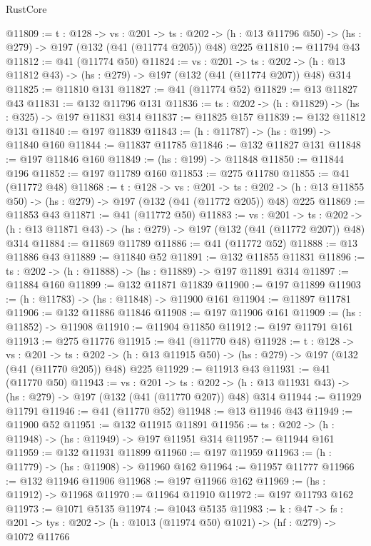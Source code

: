\begin{lexlean}{RustCore}
\begin{coremodule}
@11809 := {t : @128} ->
  {vs : @201} ->
  {ts : @202} -> (h : @13 @11796 @50) -> (hs : @279) -> @197 (@132 (@41 (@11774 @205)) @48) @225
@11810 := @11794 @43
@11812 := @41 (@11774 @50)
@11824 := {vs : @201} ->
  {ts : @202} -> (h : @13 @11812 @43) -> (hs : @279) -> @197 (@132 (@41 (@11774 @207)) @48) @314
@11825 := @11810 @131
@11827 := @41 (@11774 @52)
@11829 := @13 @11827 @43
@11831 := @132 @11796 @131
@11836 := {ts : @202} -> (h : @11829) -> (hs : @325) -> @197 @11831 @314
@11837 := @11825 @157
@11839 := @132 @11812 @131
@11840 := @197 @11839
@11843 := (h : @11787) -> (hs : @199) -> @11840 @160
@11844 := @11837 @11785
@11846 := @132 @11827 @131
@11848 := @197 @11846 @160
@11849 := (hs : @199) -> @11848
@11850 := @11844 @196
@11852 := @197 @11789 @160
@11853 := @275 @11780
@11855 := @41 (@11772 @48)
@11868 := {t : @128} ->
  {vs : @201} ->
  {ts : @202} -> (h : @13 @11855 @50) -> (hs : @279) -> @197 (@132 (@41 (@11772 @205)) @48) @225
@11869 := @11853 @43
@11871 := @41 (@11772 @50)
@11883 := {vs : @201} ->
  {ts : @202} -> (h : @13 @11871 @43) -> (hs : @279) -> @197 (@132 (@41 (@11772 @207)) @48) @314
@11884 := @11869 @11789
@11886 := @41 (@11772 @52)
@11888 := @13 @11886 @43
@11889 := @11840 @52
@11891 := @132 @11855 @11831
@11896 := {ts : @202} -> (h : @11888) -> (hs : @11889) -> @197 @11891 @314
@11897 := @11884 @160
@11899 := @132 @11871 @11839
@11900 := @197 @11899
@11903 := (h : @11783) -> (hs : @11848) -> @11900 @161
@11904 := @11897 @11781
@11906 := @132 @11886 @11846
@11908 := @197 @11906 @161
@11909 := (hs : @11852) -> @11908
@11910 := @11904 @11850
@11912 := @197 @11791 @161
@11913 := @275 @11776
@11915 := @41 (@11770 @48)
@11928 := {t : @128} ->
  {vs : @201} ->
  {ts : @202} -> (h : @13 @11915 @50) -> (hs : @279) -> @197 (@132 (@41 (@11770 @205)) @48) @225
@11929 := @11913 @43
@11931 := @41 (@11770 @50)
@11943 := {vs : @201} ->
  {ts : @202} -> (h : @13 @11931 @43) -> (hs : @279) -> @197 (@132 (@41 (@11770 @207)) @48) @314
@11944 := @11929 @11791
@11946 := @41 (@11770 @52)
@11948 := @13 @11946 @43
@11949 := @11900 @52
@11951 := @132 @11915 @11891
@11956 := {ts : @202} -> (h : @11948) -> (hs : @11949) -> @197 @11951 @314
@11957 := @11944 @161
@11959 := @132 @11931 @11899
@11960 := @197 @11959
@11963 := (h : @11779) -> (hs : @11908) -> @11960 @162
@11964 := @11957 @11777
@11966 := @132 @11946 @11906
@11968 := @197 @11966 @162
@11969 := (hs : @11912) -> @11968
@11970 := @11964 @11910
@11972 := @197 @11793 @162
@11973 := @1071 @5135
@11974 := @1043 @5135
@11983 := {k : @47} ->
  {fs : @201} -> {tys : @202} -> (h : @1013 (@11974 @50) @1021) -> (hf : @279) -> @1072 @11766

\end{coremodule}
\end{lexlean}
